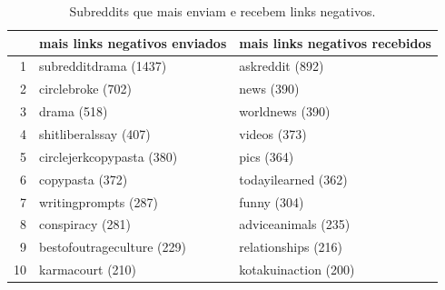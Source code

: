 \begin{table}[htbp]
\centering
\small
\caption{Subreddits que mais enviam e recebem links negativos.}
\label{tab:08_links_negativos}
\begin{tabular}{rll}
\toprule
 & mais links negativos enviados & mais links negativos recebidos \\
\midrule
1 & subredditdrama (1437) & askreddit (892) \\
2 & circlebroke (702) & news (390) \\
3 & drama (518) & worldnews (390) \\
4 & shitliberalssay (407) & videos (373) \\
5 & circlejerkcopypasta (380) & pics (364) \\
6 & copypasta (372) & todayilearned (362) \\
7 & writingprompts (287) & funny (304) \\
8 & conspiracy (281) & adviceanimals (235) \\
9 & bestofoutrageculture (229) & relationships (216) \\
10 & karmacourt (210) & kotakuinaction (200) \\
\bottomrule
\end{tabular}
\end{table}

